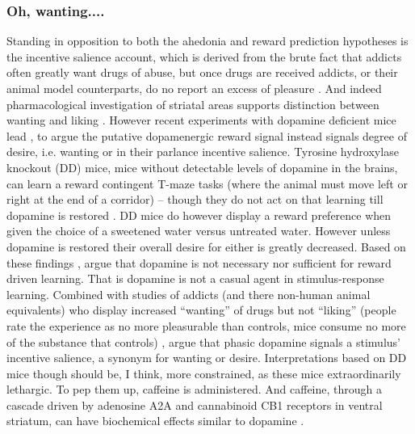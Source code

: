 \documentclass[doc,12pt]{apa}        %
\begin{document}
\subsubsection{Oh, wanting....}
\label{salience}
Standing in opposition to both the ahedonia and reward prediction hypotheses is the incentive salience account, which is derived from the brute fact that addicts often greatly want drugs of abuse, but once drugs are received addicts, or their animal model counterparts, do no report an excess of pleasure \cite{Robinson:1993p8987}.  And indeed pharmacological investigation of striatal areas supports distinction between wanting and liking \cite{Berridge:2003p8998}.  However recent experiments with dopamine deficient mice lead , to argue the putative dopamenergic reward signal instead signals degree of desire, i.e. wanting or in their parlance incentive salience.  Tyrosine hydroxylase knockout (DD) mice, mice without detectable levels of dopamine in the brains, can learn a reward contingent T-maze tasks (where the animal must move left or right at the end of a corridor) -- though they do not act on that learning till dopamine is restored \cite{Berridge:2007p7235}.  DD mice do however display a reward preference when given the choice of a sweetened water versus untreated water. However unless dopamine is restored their overall desire for either is greatly decreased.  Based on these findings , argue that dopamine is not necessary nor sufficient for reward driven learning.  That is dopamine is not a casual agent in stimulus-response learning.  Combined with studies of addicts (and there non-human animal equivalents) who display increased ``wanting'' of drugs but not ``liking'' (people rate the experience as no more pleasurable than controls, mice consume no more of the substance that controls) , argue that phasic dopamine signals a stimulus' incentive salience, a synonym for wanting or desire.  Interpretations based on DD mice though should be, I think, more constrained, as these mice extraordinarily lethargic.  To pep them up, caffeine is administered.  And caffeine, through a cascade driven by adenosine A2A and cannabinoid CB1 receptors in ventral striatum, can have biochemical effects similar to dopamine \cite{Lazarus:2011p8137, Rossi:2010p7252}.
\end{document}

